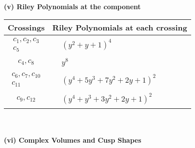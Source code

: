 \documentclass[1p]{elsarticle_modified}
\theoremstyle{definition}
\begin{document}
\newpage\renewcommand{\arraystretch}{1}
\flushleft \textbf{(v) Riley Polynomials at the component}\newline \\
\begin{tabular}{m{50pt}|m{274pt}}
Crossings & \hspace{64pt}Riley Polynomials at each crossing \\
\hline $$\begin{aligned}c_{1},c_{2},c_{3}\\c_{5}\end{aligned}$$&$\begin{aligned}
&(y^2+y+1)^4
\end{aligned}$\\
\hline $$\begin{aligned}c_{4},c_{8}\end{aligned}$$&$\begin{aligned}
&y^8
\end{aligned}$\\
\hline $$\begin{aligned}c_{6},c_{7},c_{10}\\c_{11}\end{aligned}$$&$\begin{aligned}
&(y^4+5 y^3+7 y^2+2 y+1)^2
\end{aligned}$\\
\hline $$\begin{aligned}c_{9},c_{12}\end{aligned}$$&$\begin{aligned}
&(y^4+y^3+3 y^2+2 y+1)^2
\end{aligned}$\\
\hline
\end{tabular}\\~\\
\newpage\flushleft \textbf{(vi) Complex Volumes and Cusp Shapes}
\end{document}
